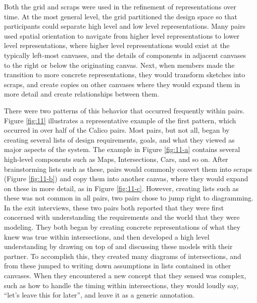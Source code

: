 \documentclass[12pt,fleqn]{ucithesis}
\begin{document}
Both the grid and scraps were used in the refinement of representations over time. At the most general level, the grid partitioned the design space so that participants could separate high level and low level representations. Many pairs used spatial orientation to navigate from higher level representations to lower level representations, where higher level representations would exist at the typically left-most canvases, and the details of components in adjacent canvases to the right or below the originating canvas. Next, when members made the transition to more concrete representations, they would transform sketches into scraps, and create copies on other canvases where they would expand them in more detail and create relationships between them. 

There were two patterns of this behavior that occurred frequently within pairs. Figure \ref{fig:11} illustrates a representative example of the first pattern, which occurred in over half of the Calico pairs. Most pairs, but not all, began by creating several lists of design requirements, goals, and what they viewed as major aspects of the system. The example in Figure \ref{fig:11-a} contains several high-level components such as Maps, Intersections, Cars, and so on. After brainstorming lists such as these, pairs would commonly convert them into scraps (Figure \ref{fig:11-b}) and copy them into another canvas, where they would expand on these in more detail, as in Figure \ref{fig:11-c}. However, creating lists such as these was not common in all pairs, two pairs chose to jump right to diagramming. In the exit interviews, these two pairs both reported that they were first concerned with understanding the requirements and the world that they were modeling. They both began by creating concrete representations of what they knew was true within intersections, and then developed a high level understanding by drawing on top of and discussing these models with their partner. To accomplish this, they created many diagrams of intersections, and from these jumped to writing down assumptions in lists contained in other canvases. When they encountered a new concept that they sensed was complex, such as how to handle the timing within intersections, they would loudly say, ``let's leave this for later'', and leave it as a generic annotation.
\end{document}
